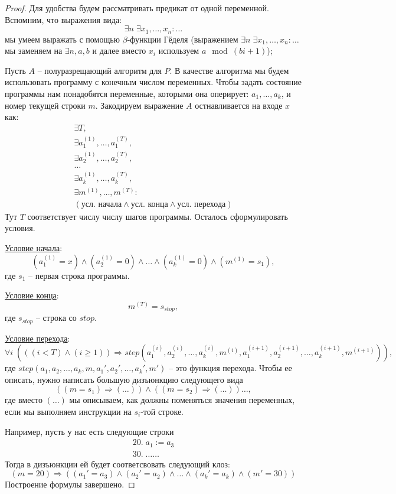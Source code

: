 \begin{proof}
    Для удобства будем рассматривать предикат от одной переменной. Вспомним, что выражения вида: \[ \exists n \; \exists x_1, \dots, x_n : \dots \] мы умеем выражать с помощью $\beta$-функции Гёделя (выражением $\exists n \; \exists x_1, \dots, x_n : \dots$ мы заменяем на $\exists n, a, b$ и далее вместо $x_i$ используем $a \mod (bi + 1)$); 

    Пусть $A$ -- полуразрещающий алгоритм для $P$. В качестве алгоритма мы будем использовать программу с конечным числом переменных. Чтобы задать состояние программы нам понадобятся переменные, которыми она оперирует: $a_1, \dots, a_k$, и номер текущей строки $m$. Закодируем выражение $A$ остнавливается на входе $x$ как: \begin{gather*}
        \exists T, \\
        \exists a_1^{(1)}, \dots, a_1^{(T)}, \\
        \exists a_2^{(1)}, \dots, a_2^{(T)}, \\
        \dots \\
        \exists a_k^{(1)}, \dots, a_k^{(T)}, \\
        \exists m^{(1)}, \dots, m^{(T)} : \\
        (\text{усл. начала} \land \text{усл. конца} \land \text{усл. перехода})
    \end{gather*}
    Тут $T$ соответствует числу числу шагов программы. Осталось сформулировать условия.

    \underline{Условие начала}: \[ (a_1^{(1)} = x) \land (a_2^{(1)} = 0) \land \dots \land (a_k^{(1)} = 0) \land (m^{(1)} = s_1), \] где $s_1$ -- первая строка программы.
    
    \underline{Условие конца}: \[ m^{(T)} = s_{stop}, \] где $s_{stop}$ -- строка со $stop$.

    \underline{Условие перехода}: \[ \forall i \; (((i < T) \land (i \geqslant 1)) \Rightarrow step(a_1^{(i)}, a_2^{(i)}, \dots, a_k^{(i)}, m^{(i)}, a_1^{(i+1)}, a_2^{(i+1)}, \dots, a_k^{(i+1)}, m^{(i+1)})), \] где $step(a_1, a_2, \dots, a_k, m, a_1', a_2', \dots, a_k', m')$ -- это функция перехода. Чтобы ее описать, нужно написать большую дизъюнкцию следующего вида \[ ((m = s_1) \Rightarrow (\dots)) \land ((m = s_2) \Rightarrow (\dots)) \dots, \] где вместо $(\dots)$ мы описываем, как должны поменяться значения переменных, если мы выполняем инструкции на $s_i$-той строке.

    Например, пусть у нас есть следующие строки \begin{gather*}
        20. \; a_1 := a_3 \\
        30. \; \dots \dots \;
    \end{gather*}  
    Тогда в дизъюнкции ей будет соответсвовать следующий клоз: \[ (m = 20) \Rightarrow ((a_1' = a_3) \land (a_2' = a_2) \land \dots \land (a_k' = a_k) \land(m' = 30)) \]
    Построение формулы завершено.
\end{proof}

